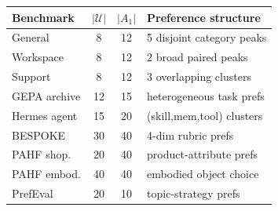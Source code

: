 \documentclass{article} %
\begin{document}
\begin{table}[t]
\centering
\small
\begin{minipage}[t]{0.48\textwidth}
\vspace{0pt}
\centering
\captionsetup{justification=raggedright,singlelinecheck=false}
\label{tab:envs}
\begingroup
\scriptsize
\setlength{\tabcolsep}{2.5pt}
\begin{tabular}{lccl}
\toprule
\textbf{Benchmark} & $|\mathcal{U}|$ & $|A_1|$ & Preference structure \\
\midrule
General       &  8 & 12 & 5 disjoint category peaks \\
Workspace     &  8 & 12 & 2 broad paired peaks \\
Support       &  8 & 12 & 3 overlapping clusters \\
GEPA archive  & 12 & 15 & heterogeneous task prefs \\
Hermes agent  & 15 & 20 & (skill,mem,tool) clusters \\
BESPOKE       & 30 & 40 & 4-dim rubric prefs \\
PAHF shop.    & 20 & 40 & product-attribute prefs \\
PAHF embod.   & 40 & 40 & embodied object choice \\
PrefEval      & 20 & 10 & topic-strategy prefs \\
\bottomrule
\end{tabular}
\endgroup


\end{minipage}
\end{table}
\end{document}
